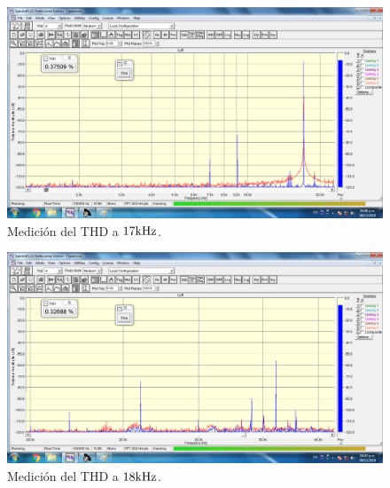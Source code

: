 \clearpage


\begin{figure}[H]
    \centering
    \includegraphics[width=0.95 \textwidth, angle=0]{img/mediciones/THD/17khz.png}
    \caption{Medición del THD a $17 \si[per-mode=symbol]{\kilo\hertz}$.}
    \label{fig:THD17khz}
\end{figure}


\begin{figure}[H]
    \centering
    \includegraphics[width=0.95 \textwidth, angle=0]{img/mediciones/THD/18khz.png}
    \caption{Medición del THD a $18 \si[per-mode=symbol]{\kilo\hertz}$.}
    \label{fig:THD18khz}
\end{figure}



\clearpage



